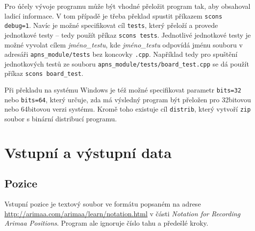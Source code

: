 \documentclass{article}
\begin{document}
Pro účely vývoje programu může být vhodné přeložit program tak, aby obsahoval ladicí informace. V tom případě je třeba
překlad spustit příkazem \verb+scons debug=1+. Navíc je možné specifikovat cíl \texttt{tests}, který přeloží a provede
jednotkové testy -- tedy použít příkaz \verb+scons tests+. Jednotlivé jednotkové testy je možné vyvolat cílem
\emph{jméno\_testu}, kde \emph{jméno\_testu} odpovídá jménu souboru v adresáři \texttt{apns\_module/tests} bez koncovky
\texttt{.cpp}. Například tedy pro spuštění jednotkových testů ze souboru \texttt{apns\_module/tests/board\_test.cpp} se
dá použít příkaz \verb+scons board_test+.

Při překladu na systému Windows je též možné specifikovat parametr \texttt{bits=32} nebo \texttt{bits=64}, který určuje,
zda má výsledný program být přeložen pro 32bitovou nebo 64bitovou verzi systému. Kromě toho existuje cíl
\texttt{distrib}, který vytvoří \texttt{zip} soubor s binární distribucí programu.

\section{Vstupní a výstupní data}
\subsection{Pozice}
Vstupní pozice je textový soubor ve formátu popsaném na adrese \url{http://arimaa.com/arimaa/learn/notation.html} v
části \emph{Notation for Recording Arimaa Positions}. Program ale ignoruje číslo tahu a předešlé kroky.
\end{document}
